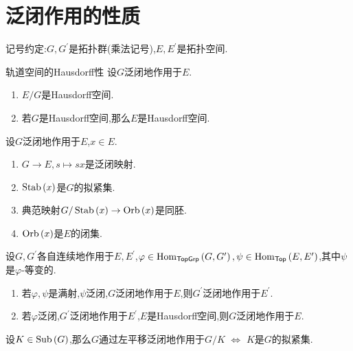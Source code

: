 \section{泛闭作用的性质}

记号约定:$G,G^{\prime}$是拓扑群(乘法记号),$E,E^{\prime}$是拓扑空间.

\begin{proposition}{轨道空间的Hausdorff性}{}
	设$G$泛闭地作用于$E$.
	\begin{enumerate}
		\item $E/G$是Hausdorff空间.
		\item 若$G$是Hausdorff空间,那么$E$是Hausdorff空间.
	\end{enumerate}
\end{proposition}

\begin{proposition}{}{}
	设$G$泛闭地作用于$E$,$x\in E$.
	\begin{enumerate}
		\item $G\to E,s\mapsto sx$是泛闭映射.
		\item $\operatorname{Stab}\left(x\right)$是$G$的拟紧集.
		\item 典范映射$G/\operatorname{Stab}\left(x\right)\to\operatorname{Orb}\left(x\right)$是同胚.
		\item $\operatorname{Orb}\left(x\right)$是$E$的闭集.
	\end{enumerate}
\end{proposition}

\begin{proposition}{}{}
	设$G,G^{\prime}$各自连续地作用于$E,E^{\prime}$,$\varphi\in\operatorname{Hom}_{\mathsf{TopGrp}}\left(G,G^{\prime}\right),\psi\in\operatorname{Hom}_{\mathsf{Top}}\left(E,E^{\prime}\right)$,其中$\psi$是$\varphi$-等变的.
	\begin{enumerate}
		\item 若$\varphi,\psi$是满射,$\psi$泛闭,$G$泛闭地作用于$E$,则$G^{\prime}$泛闭地作用于$E^{\prime}$.
		\item 若$\varphi$泛闭,$G^{\prime}$泛闭地作用于$E^{\prime}$,$E$是Hausdorff空间,则$G$泛闭地作用于$E$.
	\end{enumerate}
\end{proposition}

\begin{corollary}{}{}
	设$K\in\operatorname{Sub}\left(G\right)$,那么$G$通过左平移泛闭地作用于$G/K$ $\iff$ $K$是$G$的拟紧集.
\end{corollary}

